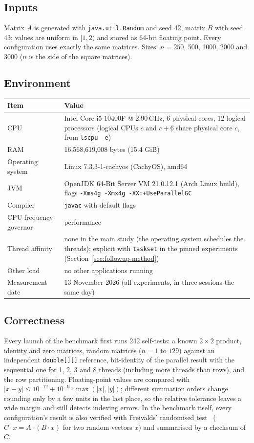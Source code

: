 \documentclass[11pt,a4paper]{article}
\newcommand{\code}[1]{\texttt{#1}}
\begin{document}
\subsection{Inputs}

Matrix $A$ is generated with \code{java.util.Random} and seed 42, matrix $B$ with seed 43; values are uniform in $[1, 2)$ and stored as 64-bit floating point. Every configuration uses exactly the same matrices. Sizes: $n = 250$, 500, 1000, 2000 and 3000 ($n$ is the side of the square matrices).

\subsection{Environment}

\begin{table}[H]
\centering\small
\begin{tabularx}{\linewidth}{@{}lX@{}}
\toprule
Item & Value \\
\midrule
CPU & Intel Core i5-10400F @ 2.90\,GHz, 6 physical cores, 12 logical processors (logical CPUs $c$ and $c+6$ share physical core $c$, from \code{lscpu -e}) \\
RAM & 16,568,619,008 bytes (15.4 GiB) \\
Operating system & Linux 7.3.3-1-cachyos (CachyOS), amd64 \\
JVM & OpenJDK 64-Bit Server VM 21.0.12.1 (Arch Linux build), flags \code{-Xms4g -Xmx4g -XX:+UseParallelGC} \\
Compiler & \code{javac} with default flags \\
CPU frequency governor & performance \\
Thread affinity & none in the main study (the operating system schedules the threads); explicit with \code{taskset} in the pinned experiments (Section~\ref{sec:followup-method}) \\
Other load & no other applications running \\
Measurement date & 13 November 2026 (all experiments, in three sessions the same day) \\
\bottomrule
\end{tabularx}
\end{table}

\subsection{Correctness}

Every launch of the benchmark first runs 242 self-tests: a known $2\times2$ product, identity and zero matrices, random matrices ($n = 1$ to $129$) against an independent \code{double[][]} reference, bit-identity of the parallel result with the sequential one for 1, 2, 3 and 8 threads (including more threads than rows), and the row partitioning. Floating-point values are compared with $|x - y| \le 10^{-12} + 10^{-9}\cdot\max(|x|, |y|)$; different summation orders change rounding only by a few units in the last place, so the relative tolerance leaves a wide margin and still detects indexing errors. In the benchmark itself, every configuration's result is also verified with Freivalds' randomised test~\cite{freivalds} ($C\cdot x = A\cdot(B\cdot x)$ for two random vectors $x$) and summarised by a checksum of $C$.
\end{document}
